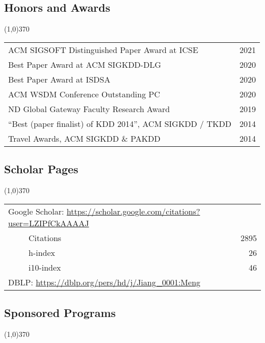\documentclass[10pt]{article}
\newcounter{list}
\begin{document}
\vspace{-0.6cm}
\subsection{\sc Honors and Awards}
\vspace{-0.4cm} \line(1,0){370} \vspace{-0.1cm}

\begin{table}[h!]
\begin{tabular*}{12.7cm}{p{11.65cm}r}
ACM SIGSOFT Distinguished Paper Award at ICSE & 2021 \\
Best Paper Award at ACM SIGKDD-DLG & 2020 \\
Best Paper Award at ISDSA & 2020 \\
ACM WSDM Conference Outstanding PC & 2020 \\
ND Global Gateway Faculty Research Award & 2019 \\
``Best (paper finalist) of KDD 2014'', ACM SIGKDD / TKDD & 2014 \\
Travel Awards, ACM SIGKDD \& PAKDD & 2014 \\
\end{tabular*}
\end{table}

\vspace{-0.6cm}
\subsection{\sc Scholar Pages}
\vspace{-0.4cm} \line(1,0){370} \vspace{-0.1cm}

\begin{table}[h!]
\begin{tabular*}{12.7cm}{p{11.65cm}r}
\multicolumn{2}{l}{Google Scholar: \url{https://scholar.google.com/citations?user=LZIPfCkAAAAJ}} \\
~~~~~Citations & 2895 \\
~~~~~h-index & 26 \\
~~~~~i10-index & 46 \\
\multicolumn{2}{l}{DBLP: \url{https://dblp.org/pers/hd/j/Jiang\_0001:Meng}} \\
\end{tabular*}
\end{table}

\subsection{\sc Sponsored Programs}
\vspace{-0.4cm} \line(1,0){370} \vspace{-0.1cm}
\end{document}
